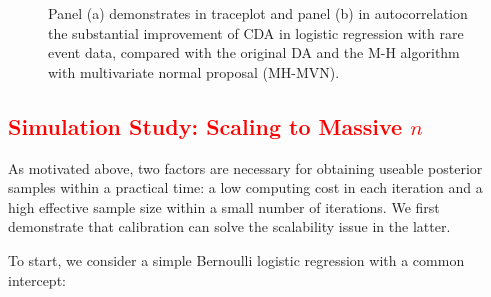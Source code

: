 \documentclass[11pt]{article}
\newcommand{\leo}[1]{{\textcolor{red}{#1}}}
\begin{document}
\begin{figure}[H]
  {%
    \qquad
  }
  {\caption{Panel (a) demonstrates in traceplot and panel (b) in autocorrelation the substantial improvement of CDA in logistic regression with rare event data, compared with the original DA \citep{polson2013bayesian} and the M-H algorithm with multivariate normal proposal (MH-MVN).\label{logit_random_mixing}}}
\end{figure}

\leo{
\section{Simulation Study: Scaling to Massive $n$}
}

As motivated above,  two factors are necessary for obtaining useable posterior samples within a practical  time: a low computing cost  in each iteration and a high effective sample size within a small number of iterations. We first demonstrate that calibration can solve the scalability issue in the latter.

To start, we consider a simple Bernoulli logistic regression with a common intercept:
\end{document}

